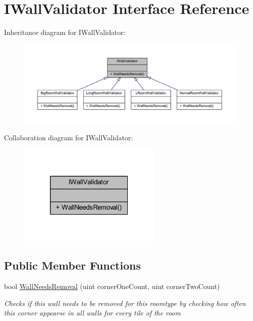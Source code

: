 \hypertarget{interface_i_wall_validator}{}\section{I\+Wall\+Validator Interface Reference}
\label{interface_i_wall_validator}


Inheritance diagram for I\+Wall\+Validator\+:
\nopagebreak
\begin{figure}[H]
\begin{center}
\leavevmode
\includegraphics[width=350pt]{interface_i_wall_validator__inherit__graph}
\end{center}
\end{figure}


Collaboration diagram for I\+Wall\+Validator\+:
\nopagebreak
\begin{figure}[H]
\begin{center}
\leavevmode
\includegraphics[width=196pt]{interface_i_wall_validator__coll__graph}
\end{center}
\end{figure}
\subsection*{Public Member Functions}
\begin{DoxyCompactItemize}
\item 
bool \mbox{\hyperlink{interface_i_wall_validator_a1618acf45bf2614985aeb8b240bf7da8}{Wall\+Needs\+Removal}} (uint corner\+One\+Count, uint corner\+Two\+Count)
\begin{DoxyCompactList}\small\item\em Checks if this wall needs to be removed for this roomtype by checking how often this corner appearse in all walls for every tile of the room \end{DoxyCompactList}\end{DoxyCompactItemize}


